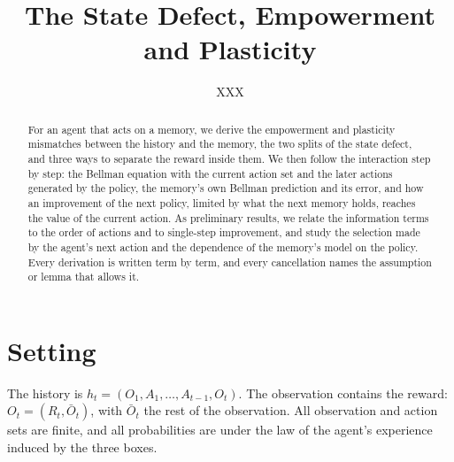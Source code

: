 \documentclass{article}
\title{The State Defect, Empowerment and Plasticity}
\author{XXX}
\theoremstyle{definition}
\theoremstyle{remark}
\newcommand{\Ob}{\bar O}
\begin{document}
\maketitle

\begin{abstract}
For an agent that acts on a memory, we derive the empowerment and plasticity mismatches between the history and the memory, the two splits of the state defect, and three ways to separate the reward inside them. We then follow the interaction step by step: the Bellman equation with the current action set and the later actions generated by the policy, the memory's own Bellman prediction and its error, and how an improvement of the next policy, limited by what the next memory holds, reaches the value of the current action. As preliminary results, we relate the information terms to the order of actions and to single-step improvement, and study the selection made by the agent's next action and the dependence of the memory's model on the policy. Every derivation is written term by term, and every cancellation names the assumption or lemma that allows it.
\end{abstract}

\section{Setting}\label{sec:setting}

\begin{center}
\end{center}

The history is $h_t=(O_1,A_1,\dots,A_{t-1},O_t)$. The observation contains the reward: $O_t=(R_t,\Ob_t)$, with $\Ob_t$ the rest of the observation. All observation and action sets are finite, and all probabilities are under the law of the agent's experience induced by the three boxes.
\end{document}
